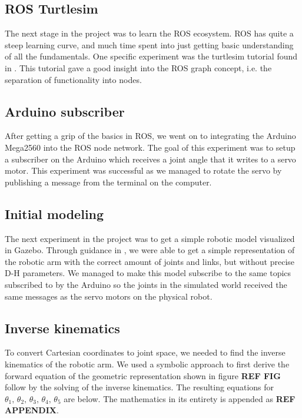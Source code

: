 \documentclass[11pt,a4paper, titlepage]{article}
\begin{document}
	\subsection{ROS Turtlesim}
	The next stage in the project was to learn the ROS ecosystem. ROS has quite a steep learning curve, and much time spent into just getting basic understanding of all the fundamentals. One specific experiment was the turtlesim tutorial found in \cite{turtle2017}. This tutorial gave a good insight into the ROS graph concept, i.e. the separation of functionality into nodes.
	
	\subsection{Arduino subscriber}
	After getting a grip of the basics in ROS, we went on to integrating the Arduino Mega2560 into the ROS node network. The goal of this experiment was to setup a subscriber on the Arduino which receives a joint angle that it writes to a servo motor. This experiment was successful as we managed to rotate the servo by publishing a message from the terminal on the computer.
	
	\subsection{Initial modeling}
	The next experiment in the project was to get a simple robotic model visualized in Gazebo. Through guidance in \cite{joseph2015}, we were able to get a simple representation of the robotic arm with the correct amount of joints and links, but without precise D-H parameters. We managed to make this model subscribe to the same topics subscribed to by the Arduino so the joints in the simulated world received the same messages as the servo motors on the physical robot.
	
	\subsection{Inverse kinematics}
	To convert Cartesian coordinates to joint space, we needed to find the inverse kinematics of the robotic arm. We used a symbolic approach to first derive the forward equation of the geometric representation shown in figure \textbf{REF FIG} follow by the solving of the inverse kinematics. The resulting equations for $\theta_1,\,\theta_2,\,\theta_3,\,\theta_4,\,\theta_5$ are below. The mathematics in its entirety is appended as \textbf{REF APPENDIX}.
	
\end{document}
